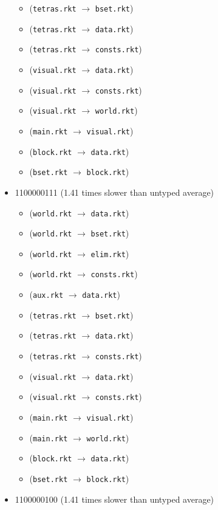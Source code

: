 \documentclass{article}
\newcommand{\mono}[1]{\texttt{#1}}
\begin{document}
\begin{itemize}
\begin{itemize}
  \item (\mono{tetras.rkt} $\rightarrow$ \mono{bset.rkt})
  \item (\mono{tetras.rkt} $\rightarrow$ \mono{data.rkt})
  \item (\mono{tetras.rkt} $\rightarrow$ \mono{consts.rkt})
  \item (\mono{visual.rkt} $\rightarrow$ \mono{data.rkt})
  \item (\mono{visual.rkt} $\rightarrow$ \mono{consts.rkt})
  \item (\mono{visual.rkt} $\rightarrow$ \mono{world.rkt})
  \item (\mono{main.rkt} $\rightarrow$ \mono{visual.rkt})
  \item (\mono{block.rkt} $\rightarrow$ \mono{data.rkt})
  \item (\mono{bset.rkt} $\rightarrow$ \mono{block.rkt})
  \end{itemize}
\item 1100000111 (1.41 times slower than untyped average)
  \begin{itemize}
  \item (\mono{world.rkt} $\rightarrow$ \mono{data.rkt})
  \item (\mono{world.rkt} $\rightarrow$ \mono{bset.rkt})
  \item (\mono{world.rkt} $\rightarrow$ \mono{elim.rkt})
  \item (\mono{world.rkt} $\rightarrow$ \mono{consts.rkt})
  \item (\mono{aux.rkt} $\rightarrow$ \mono{data.rkt})
  \item (\mono{tetras.rkt} $\rightarrow$ \mono{bset.rkt})
  \item (\mono{tetras.rkt} $\rightarrow$ \mono{data.rkt})
  \item (\mono{tetras.rkt} $\rightarrow$ \mono{consts.rkt})
  \item (\mono{visual.rkt} $\rightarrow$ \mono{data.rkt})
  \item (\mono{visual.rkt} $\rightarrow$ \mono{consts.rkt})
  \item (\mono{main.rkt} $\rightarrow$ \mono{visual.rkt})
  \item (\mono{main.rkt} $\rightarrow$ \mono{world.rkt})
  \item (\mono{block.rkt} $\rightarrow$ \mono{data.rkt})
  \item (\mono{bset.rkt} $\rightarrow$ \mono{block.rkt})
  \end{itemize}
\item 1100000100 (1.41 times slower than untyped average)

\end{itemize}
\end{document}
